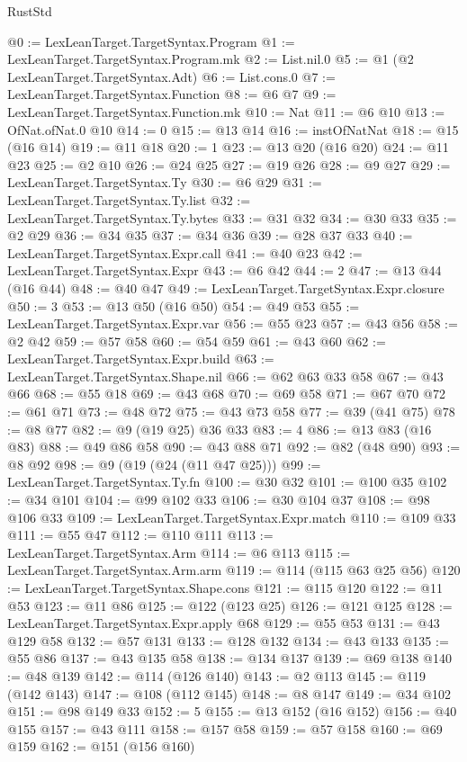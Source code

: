 \begin{lexlean}{RustStd}
\begin{coremodule}
@0 := LexLeanTarget.TargetSyntax.Program
@1 := LexLeanTarget.TargetSyntax.Program.mk
@2 := List.nil.{0}
@5 := @1 (@2 LexLeanTarget.TargetSyntax.Adt)
@6 := List.cons.{0}
@7 := LexLeanTarget.TargetSyntax.Function
@8 := @6 @7
@9 := LexLeanTarget.TargetSyntax.Function.mk
@10 := Nat
@11 := @6 @10
@13 := OfNat.ofNat.{0} @10
@14 := 0
@15 := @13 @14
@16 := instOfNatNat
@18 := @15 (@16 @14)
@19 := @11 @18
@20 := 1
@23 := @13 @20 (@16 @20)
@24 := @11 @23
@25 := @2 @10
@26 := @24 @25
@27 := @19 @26
@28 := @9 @27
@29 := LexLeanTarget.TargetSyntax.Ty
@30 := @6 @29
@31 := LexLeanTarget.TargetSyntax.Ty.list
@32 := LexLeanTarget.TargetSyntax.Ty.bytes
@33 := @31 @32
@34 := @30 @33
@35 := @2 @29
@36 := @34 @35
@37 := @34 @36
@39 := @28 @37 @33
@40 := LexLeanTarget.TargetSyntax.Expr.call
@41 := @40 @23
@42 := LexLeanTarget.TargetSyntax.Expr
@43 := @6 @42
@44 := 2
@47 := @13 @44 (@16 @44)
@48 := @40 @47
@49 := LexLeanTarget.TargetSyntax.Expr.closure
@50 := 3
@53 := @13 @50 (@16 @50)
@54 := @49 @53
@55 := LexLeanTarget.TargetSyntax.Expr.var
@56 := @55 @23
@57 := @43 @56
@58 := @2 @42
@59 := @57 @58
@60 := @54 @59
@61 := @43 @60
@62 := LexLeanTarget.TargetSyntax.Expr.build
@63 := LexLeanTarget.TargetSyntax.Shape.nil
@66 := @62 @63 @33 @58
@67 := @43 @66
@68 := @55 @18
@69 := @43 @68
@70 := @69 @58
@71 := @67 @70
@72 := @61 @71
@73 := @48 @72
@75 := @43 @73 @58
@77 := @39 (@41 @75)
@78 := @8 @77
@82 := @9 (@19 @25) @36 @33
@83 := 4
@86 := @13 @83 (@16 @83)
@88 := @49 @86 @58
@90 := @43 @88 @71
@92 := @82 (@48 @90)
@93 := @8 @92
@98 := @9 (@19 (@24 (@11 @47 @25)))
@99 := LexLeanTarget.TargetSyntax.Ty.fn
@100 := @30 @32
@101 := @100 @35
@102 := @34 @101
@104 := @99 @102 @33
@106 := @30 @104 @37
@108 := @98 @106 @33
@109 := LexLeanTarget.TargetSyntax.Expr.match
@110 := @109 @33
@111 := @55 @47
@112 := @110 @111
@113 := LexLeanTarget.TargetSyntax.Arm
@114 := @6 @113
@115 := LexLeanTarget.TargetSyntax.Arm.arm
@119 := @114 (@115 @63 @25 @56)
@120 := LexLeanTarget.TargetSyntax.Shape.cons
@121 := @115 @120
@122 := @11 @53
@123 := @11 @86
@125 := @122 (@123 @25)
@126 := @121 @125
@128 := LexLeanTarget.TargetSyntax.Expr.apply @68
@129 := @55 @53
@131 := @43 @129 @58
@132 := @57 @131
@133 := @128 @132
@134 := @43 @133
@135 := @55 @86
@137 := @43 @135 @58
@138 := @134 @137
@139 := @69 @138
@140 := @48 @139
@142 := @114 (@126 @140)
@143 := @2 @113
@145 := @119 (@142 @143)
@147 := @108 (@112 @145)
@148 := @8 @147
@149 := @34 @102
@151 := @98 @149 @33
@152 := 5
@155 := @13 @152 (@16 @152)
@156 := @40 @155
@157 := @43 @111
@158 := @157 @58
@159 := @57 @158
@160 := @69 @159
@162 := @151 (@156 @160)

\end{coremodule}
\end{lexlean}
